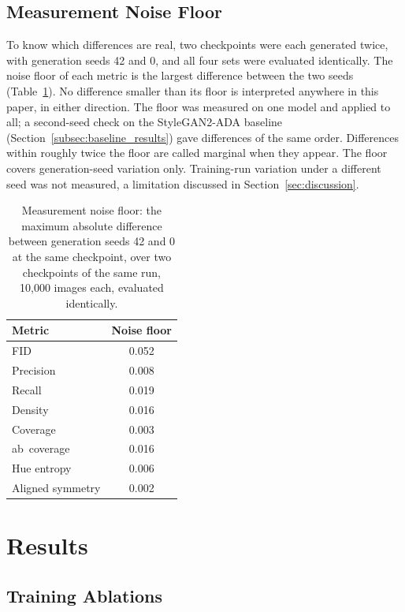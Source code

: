 \documentclass[electronics,article,submit,pdftex,moreauthors]{Definitions/mdpi}
\begin{document}
\subsection{Measurement Noise Floor}
\label{subsec:noise}

To know which differences are real, two checkpoints were each generated
twice, with generation seeds 42 and 0, and all four sets were evaluated
identically. The noise floor of each metric is the largest difference
between the two seeds (Table~\ref{tab:noise}). No difference smaller than its floor is
interpreted anywhere in this paper, in either direction. The floor was
measured on one model and applied to all; a second-seed check on the
StyleGAN2-ADA baseline (Section~\ref{subsec:baseline_results}) gave
differences of the same order. Differences within roughly twice the floor
are called marginal when they appear. The floor covers
generation-seed variation only. Training-run variation under a different
seed was not measured, a limitation discussed in
Section~\ref{sec:discussion}.

\begin{table}[H]
\caption{Measurement noise floor: the maximum absolute difference between
generation seeds 42 and 0 at the same checkpoint, over two checkpoints of
the same run, 10,000 images each, evaluated identically.}
\label{tab:noise}
\begin{tabular}{lc}
\toprule
\textbf{Metric} & \textbf{Noise floor} \\
\midrule
FID              & 0.052 \\
Precision        & 0.008 \\
Recall           & 0.019 \\
Density          & 0.016 \\
Coverage         & 0.003 \\
ab~coverage      & 0.016 \\
Hue entropy      & 0.006 \\
Aligned symmetry & 0.002 \\
\bottomrule
\end{tabular}
\end{table}

\section{Results}
\label{sec:results}

\subsection{Training Ablations}
\label{subsec:ablations}
\end{document}
